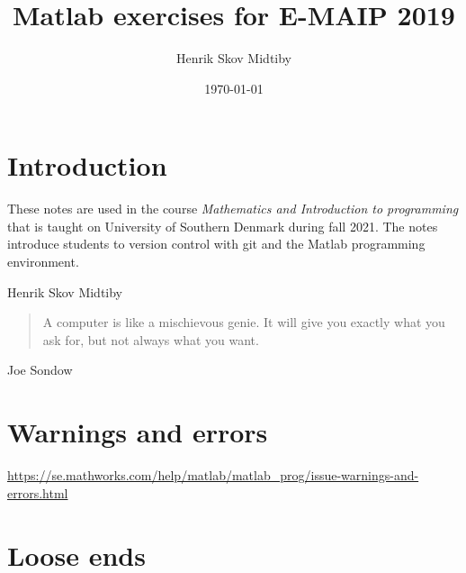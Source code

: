 \documentclass[fleqn, 12pt,a4paper]{article}
\author{Henrik Skov Midtiby}
\title{Matlab exercises for E-MAIP 2019}
\date{\today}
\begin{document}



\maketitle

\newpage
\tableofcontents

\newpage
\section*{Introduction}

These notes are used in the course \emph{Mathematics and Introduction to programming}
that is taught on University of Southern Denmark during fall 2021.
The notes introduce students to version control with git and
the Matlab programming environment.

\hfill Henrik Skov Midtiby


\vspace{2cm}


\begin{quote}
A computer is like a mischievous genie. 
It will give you exactly what you ask for, 
but not always what you want.
\end{quote}
\hfill Joe Sondow






















\section{Warnings and errors}

\url{https://se.mathworks.com/help/matlab/matlab_prog/issue-warnings-and-errors.html}


\section{Loose ends}
\end{document}
